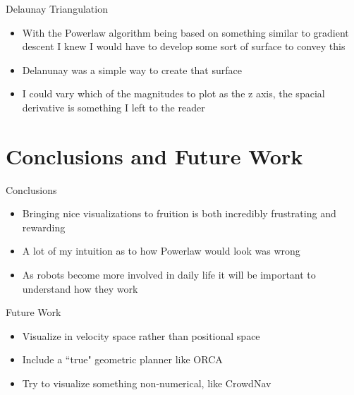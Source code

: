 \documentclass[aspectratio=169,xcolor=dvipsnames]{beamer}
\begin{document}
\begin{frame}{Delaunay Triangulation}
  \begin{itemize}
    \item With the Powerlaw algorithm being based on something similar to gradient descent I knew I would have to develop some sort of surface to convey this
    \item Delanunay was a simple way to create that surface
    \item I could vary which of the magnitudes to plot as the z axis, the spacial derivative is something I left to the reader
  \end{itemize}
\end{frame}

\section{Conclusions and Future Work}

\begin{frame}{Conclusions}
  \begin{itemize}
    \item Bringing nice visualizations to fruition is both incredibly frustrating and rewarding
    \item A lot of my intuition as to how Powerlaw would look was wrong
    \item As robots become more involved in daily life it will be important to understand how they work
  \end{itemize}
\end{frame}

\begin{frame}{Future Work}
  \begin{itemize}
    \item Visualize in velocity space rather than positional space
    \item Include a ``true" geometric planner like ORCA
    \item Try to visualize something non-numerical, like CrowdNav
  \end{itemize}
\end{frame}
\end{document}
